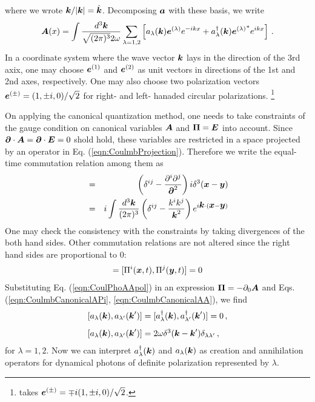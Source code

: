 where we wrote $\mbox{\boldmath $k$} / |\mbox{\boldmath $k$}| = \hat{\mbox{\boldmath $k$}}$.
Decomposing $\mbox{\boldmath $a$}$ with these basis, we write
\begin{eqnarray}
\mbox{\boldmath $A$}(x) = \int \frac{d^3 \mbox{\boldmath $k$}}{\sqrt{(2\pi)^3}2\omega} 
\sum_{\lambda = 1, 2}
\left[
a_\lambda (\mbox{\boldmath $k$}) \mbox{\boldmath $e$}^{(\lambda)} e^{-i k x} 
+ 
a_\lambda^{\dagger}(\mbox{\boldmath $k$}) {\mbox{\boldmath $e$}^{(\lambda)}}^* e^{i k x} 
\right] \,.
\label{eqn:CoulPhoAApol}
\end{eqnarray}
In a coordinate system where the wave vector $\mbox{\boldmath $k$}$ lays in the direction of the
3rd axix,
one may choose $\mbox{\boldmath $e$}^{(1)}$ and $\mbox{\boldmath $e$}^{(2)}$ as unit vectors in directions of
the 1st and 2nd axes, respectively. One may also choose two polarization vectors
$\mbox{\boldmath $e$}^{(\pm)} =  (1, \pm i , 0)/\sqrt{2}$  for right- and left- hanaded circular
polarizations.
\footnote{%
\cite{ref:Lifshitz} takes
$\mbox{\boldmath $e$}^{(\pm)} = \mp i (1, \pm i , 0)/\sqrt{2}$.
}%

On applying the canonical quantization method,
one needs to take constraints of the gauge condition on canonical
variables $\mbox{\boldmath $A$}$ and $\mbox{\boldmath $\Pi$} = \mbox{\boldmath $E$}$ into account.
Since $\mbox{\boldmath $\partial$}\cdot \mbox{\boldmath $A$} = \mbox{\boldmath $\partial$}\cdot \mbox{\boldmath $E$} = 0$ shold
hold, these variables are restricted in a space projected by
an operator in Eq. (\ref{eqn:CoulmbProjection}). Therefore we write
the equal-time commutation relation among them as
\begin{eqnarray}
[ A^i (\bld{x}, t), \Pi^j (\bld{y}, t) ]
&=&
\left(
\delta^{ij}
-
\frac{\partial^i \partial^j}
{\bld{\partial}^2}
\right)
i \delta^3 (\bld{x} - \bld{y})
\nonumber\\
&=&
i \int \frac{d^3 \bld{k}}{(2\pi)^3}
\left(
\delta^{ij}
-
\frac{k^i k^j}{\bld{k}^2}
\right)
e^{i \bld{k} \cdot (\bld{x} - \bld{y})}
\label{eqn:CoulmbCanonicalAPi}
\end{eqnarray}
One may check the consistency with the constraints by taking 
divergences of the both hand sides.
Other commutation relations are not altered since the right hand sides are
proportional to 0:
\begin{eqnarray}
[ A^i (\bld{x}, t), A^j (\bld{y}, t) ]
=
[ \Pi^i (\bld{x}, t), \Pi^j (\bld{y}, t) ]
=
0
\label{eqn:CoulmbCanonicalAA}
\end{eqnarray}
Substituting Eq. (\ref{eqn:CoulPhoAApol}) in an expression
$\mbox{\boldmath $\Pi$} = - \partial_0 \mbox{\boldmath $A$}$ and Eqs. (\ref{eqn:CoulmbCanonicalAPi}, \ref{eqn:CoulmbCanonicalAA}),
we find
\begin{eqnarray}
\begin{array}{l}
[a_\lambda(\bld{k}), a_{\lambda '}(\bld{k}')]
=
[a^\dagger_\lambda(\bld{k}), a^\dagger_{\lambda '}(\bld{k}')]
=0 \,,
\vspace{3mm}
\\
{[}a_\lambda (\bld{k}), a_{\lambda '} (\bld{k}'){]}
=
2 \omega \delta^3(\bld{k} - \bld{k}') \delta_{\lambda \lambda'} \,,
\end{array}
\end{eqnarray}
for $\lambda = 1, 2$.
Now we can interpret $a^\dagger_\lambda (\mbox{\boldmath $k$})$ and $a_\lambda (\mbox{\boldmath $k$})$
as creation and annihilation operators for dynamical photons of definite polarization represented by $\lambda$.

